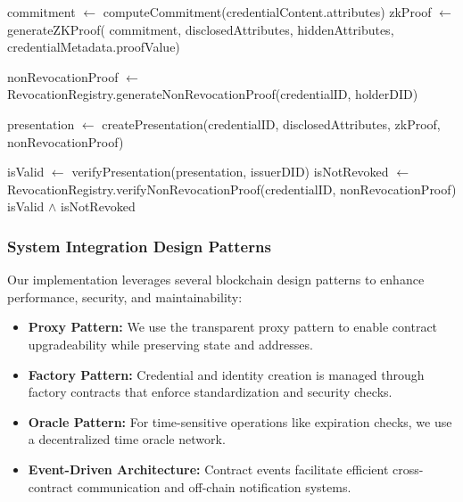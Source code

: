 \documentclass[lettersize,journal]{IEEEtran}
\begin{document}
\begin{itemize}
\begin{algorithm}[H]
\begin{algorithmic}[1]
\State {}
\State commitment $\gets$ computeCommitment(credentialContent.attributes)
\State zkProof $\gets$ generateZKProof(
\hspace{\algorithmicindent}commitment, 
\hspace{\algorithmicindent}disclosedAttributes, 
\hspace{\algorithmicindent}hiddenAttributes,
\hspace{\algorithmicindent}credentialMetadata.proofValue)

\State {}
\State nonRevocationProof $\gets$ RevocationRegistry.generateNonRevocationProof(credentialID, holderDID)

\State {}
\State presentation $\gets$ createPresentation(credentialID, disclosedAttributes, zkProof, nonRevocationProof)

\State {}
\State isValid $\gets$ verifyPresentation(presentation, issuerDID)
\State isNotRevoked $\gets$ RevocationRegistry.verifyNonRevocationProof(credentialID, nonRevocationProof)
\RETURN isValid $\wedge$ isNotRevoked
\end{algorithmic}
\end{algorithm}

\subsubsection{System Integration Design Patterns}

Our implementation leverages several blockchain design patterns to enhance performance, security, and maintainability:

\begin{itemize}
    \item \textbf{Proxy Pattern:} We use the transparent proxy pattern \cite{BlockchainPatterns2024} to enable contract upgradeability while preserving state and addresses.
    
    \item \textbf{Factory Pattern:} Credential and identity creation is managed through factory contracts that enforce standardization and security checks.
    
    \item \textbf{Oracle Pattern:} For time-sensitive operations like expiration checks, we use a decentralized time oracle network.
    
    \item \textbf{Event-Driven Architecture:} Contract events facilitate efficient cross-contract communication and off-chain notification systems.
    

\end{itemize}
\end{itemize}
\end{document}
